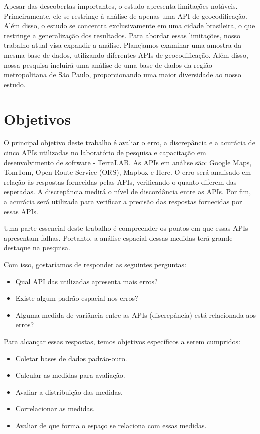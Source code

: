 Apesar das descobertas importantes, o estudo apresenta limitações notáveis. Primeiramente, ele se restringe à análise de apenas uma API de geocodificação. Além disso, o estudo se concentra exclusivamente em uma cidade brasileira, o que restringe a generalização dos resultados. Para abordar essas limitações, nosso trabalho atual visa expandir a análise. Planejamos examinar uma amostra da mesma base de dados, utilizando diferentes APIs de geocodificação. Além disso, nossa pesquisa incluirá uma análise de uma base de dados da região metropolitana de São Paulo, proporcionando uma maior diversidade ao nosso estudo.

\section{Objetivos}

O principal objetivo deste trabalho é avaliar o erro, a discrepância e a acurácia de cinco APIs utilizadas no laboratório de pesquisa e capacitação em desenvolvimento de software - TerraLAB. As APIs em análise são: Google Maps, TomTom, Open Route Service (ORS), Mapbox e Here. O erro será analisado em relação às respostas fornecidas pelas APIs, verificando o quanto diferem das esperadas. A discrepância medirá o nível de discordância entre as APIs. Por fim, a acurácia será utilizada para verificar a precisão das respostas fornecidas por essas APIs.
    
Uma parte essencial deste trabalho é compreender os pontos em que essas APIs apresentam falhas. Portanto, a análise espacial dessas medidas terá grande destaque na pesquisa.

Com isso, gostaríamos de responder as seguintes perguntas:
\begin{itemize}
   \item Qual API das utilizadas apresenta mais erros?
   \item Existe algum padrão espacial nos erros?
   \item Alguma medida de variância entre as APIs (discrepância) está relacionada aos erros?
\end{itemize}

Para alcançar essas respostas, temos objetivos específicos a serem cumpridos:

\begin{itemize}
   \item Coletar bases de dados padrão-ouro.
   \item Calcular as medidas para avaliação.
   \item Avaliar a distribuição das medidas.
   \item Correlacionar as medidas.
   \item Avaliar de que forma o espaço se relaciona com essas medidas.
\end{itemize}